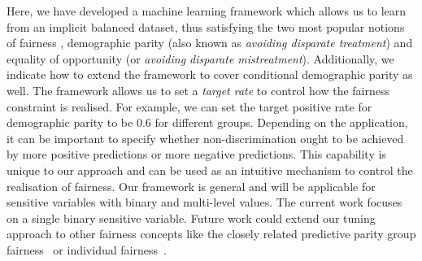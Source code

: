 Here, we have developed a machine learning framework which allows us to learn from an implicit balanced dataset,
thus satisfying the two most popular notions of fairness \citep{verma2018fairness}, demographic parity
(also known as \emph{avoiding disparate treatment}) and equality of opportunity (or \emph{avoiding disparate mistreatment}).
Additionally, we indicate how to extend the framework to cover conditional demographic parity as well.
The framework allows us to set a \emph{target rate} to control how the fairness constraint is realised.
For example, we can set the target positive rate for demographic parity to be $0.6$ for different groups.
Depending on the application, it can be important to specify
whether non-discrimination ought to be achieved by more positive predictions or more negative predictions.
%
This capability is unique to our approach and can be used as an intuitive mechanism to control the realisation of fairness.
Our framework is general and will be applicable for sensitive variables with binary and multi-level values.
The current work focuses on a single binary sensitive variable. %
Future work could extend our tuning approach to other fairness concepts like the closely related predictive parity group fairness~\citep{chouldechova2017fair}
or individual fairness~\citep{dwork2012fairness}.




